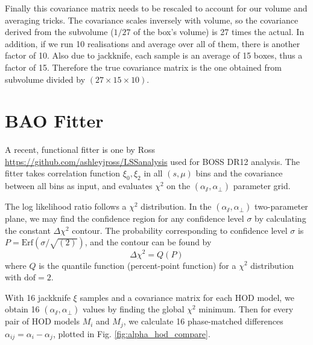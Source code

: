 \documentclass[fleqn,usenatbib]{mnras}
\begin{document}
		Finally this covariance matrix needs to be rescaled to account for our volume and averaging tricks. The covariance scales inversely with volume, so the covariance derived from the subvolume ($1/27$ of the box's volume) is 27 times the actual. In addition, if we run 10 realisations and average over all of them, there is another factor of 10. Also due to jackknife, each sample is an average of 15 boxes, thus a factor of 15. Therefore the true covariance matrix is the one obtained from subvolume divided by $ ( 27 \times 15 \times 10)$.
		
\section{BAO Fitter}

	A recent, functional fitter is one by Ross \url{https://github.com/ashleyjross/LSSanalysis} used for BOSS DR12 analysis. The fitter takes correlation function $\xi_0, \xi_2$ in all $(s,\mu)$ bins and the covariance between all bins as input, and evaluates $\chi^2$ on the $(\alpha_\varparallel, \alpha_\perp)$ parameter grid.
	
	The log likelihood ratio follows a $\chi^2$ distribution. In the $(\alpha_\varparallel, \alpha_\perp)$ two-parameter plane, we may find the confidence region for any confidence level $\sigma$ by calculating the constant $\Delta\chi^2$ contour. The probability corresponding to confidence level $\sigma$ is $P = \mathrm{Erf} (\sigma / \sqrt{(2)})$, and the contour can be found by
	\begin{equation}
		\Delta \chi^2 = Q(P)
	\end{equation}
	where $Q$ is the quantile function (percent-point function) for a $\chi^2$ distribution with $\mathrm{dof}=2$.
	
	With 16 jackknife $\xi$ samples and a covariance matrix for each HOD model, we obtain 16 $ (\alpha_\varparallel, \alpha_\perp) $ values by finding the global $\chi^2$ minimum. Then for every pair of HOD models $M_i$ and $M_j$, we calculate 16 phase-matched differences $\alpha_{ij} = \alpha_i - \alpha_j$, plotted in Fig. \ref{fig:alpha_hod_compare}.
	
\end{document}
